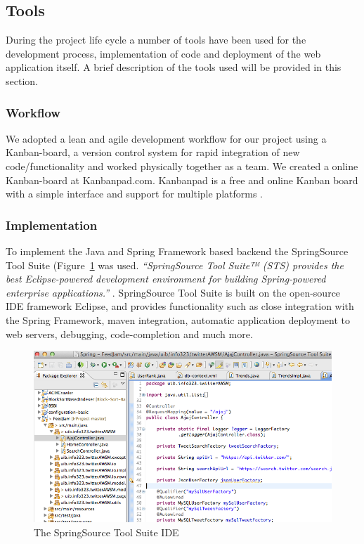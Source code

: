 \subsection{Tools} %
During the project life cycle a number of tools have been used for the development process, implementation of code and deployment of the web application itself. A brief description of the tools used will be provided in this section.


\subsubsection{Workflow}
We adopted a lean and agile development workflow for our project using a Kanban-board, a version control system for rapid integration of new code/functionality and worked physically together as a team. We created a online Kanban-board at Kanbanpad.com. Kanbanpad is a free and online Kanban board with a simple interface and support for multiple platforms \cite{TheHybridGroup2012}.

\subsubsection{Implementation}
To implement the Java and Spring Framework based backend the SpringSource Tool Suite (Figure~\ref{fig:springsourcetoolsuite} was used. \textit{``SpringSource Tool Suite™ (STS) provides the best Eclipse-powered development environment for building Spring-powered enterprise applications.''} \cite{SpringSource}. SpringSource Tool Suite is built on the open-source IDE framework Eclipse, and provides functionality such as close integration with the Spring Framework, maven integration, automatic application deployment to web servers, debugging, code-completion and much more.

\begin{figure}[ht]
    \begin{minipage}[b]{1\linewidth}
        \centering
        \includegraphics[width=1\textwidth]{figures/springsourcetoolsuite}
        \caption{The SpringSource Tool Suite IDE}
        \label{fig:springsourcetoolsuite}
    \end{minipage}
\end{figure}

